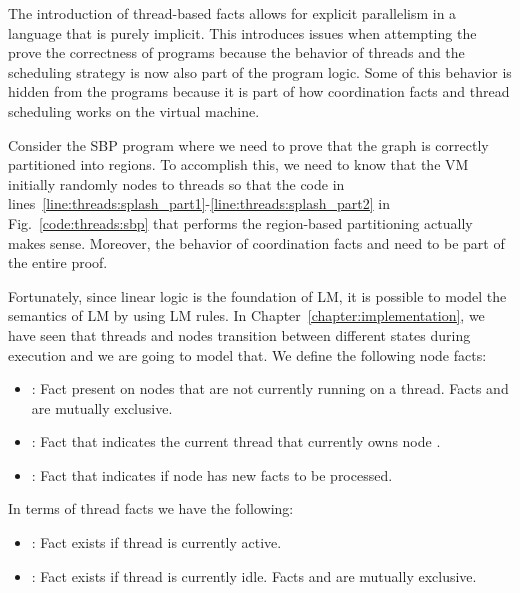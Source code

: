 The introduction of thread-based facts allows for explicit parallelism in a
language that is purely implicit. This introduces issues when attempting the
prove the correctness of programs because the behavior of threads and the
scheduling strategy is now also part of the program logic. Some of this behavior
is hidden from the programs because it is part of how coordination facts and
thread scheduling works on the virtual machine.

Consider the SBP program where we need to prove that the graph is correctly
partitioned into regions. To accomplish this, we need to know that the VM
initially randomly nodes to threads so that the code in
lines~\ref{line:threads:splash_part1}-\ref{line:threads:splash_part2} in
Fig.~\ref{code:threads:sbp} that performs the region-based partitioning actually
makes sense. Moreover, the behavior of coordination facts  and
 need to be part of the entire proof.

Fortunately, since linear logic is the foundation of LM, it is possible to model
the semantics of LM by using LM rules. In Chapter~\ref{chapter:implementation},
we have seen that threads and nodes transition between different states during
execution and we are going to model that. We define the following node
facts:

\begin{itemize}

   \item {}: Fact present on nodes that are not currently
      running on a thread. Facts  and  are
      mutually exclusive.

   \item {}: Fact that indicates the current thread
       that currently owns node .

   \item {}: Fact that indicates if node
       has new facts to be processed.

\end{itemize}

In terms of thread facts we have the following:

\begin{itemize}
   \item {}: Fact exists if thread  is currently
      active.

   \item {}: Fact exists if thread  is currently
      idle. Facts  and  are mutually exclusive.
\end{itemize}

